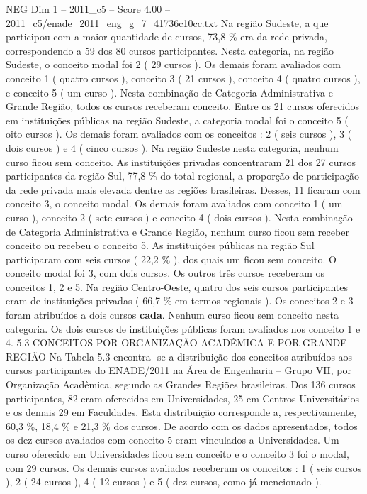 \begin{textsample}{NEG Dim 1 – 2011\_c5 – Score 4.00 – 2011\_c5/enade\_2011\_eng\_g\_7\_41736c10cc.txt}
Na região Sudeste, a que participou com a maior quantidade de cursos, 73,8 \% era da rede privada, correspondendo a 59 dos 80 cursos participantes.
Nesta categoria, na região Sudeste, o conceito modal foi 2 ( 29 cursos ).
Os demais foram avaliados com conceito 1 ( quatro cursos ), conceito 3 ( 21 cursos ), conceito 4 ( quatro cursos ), e conceito 5 ( um curso ).
Nesta combinação de Categoria Administrativa e Grande Região, todos os cursos receberam conceito.
Entre os 21 cursos oferecidos em instituições públicas na região Sudeste, a categoria modal foi o conceito 5 ( oito cursos ).
Os demais foram avaliados com os conceitos : 2 ( seis cursos ), 3 ( dois cursos ) e 4 ( cinco cursos ).
Na região Sudeste nesta categoria, nenhum curso ficou sem conceito.
As instituições privadas concentraram 21 dos 27 cursos participantes da região Sul, 77,8 \% do total regional, a proporção de participação da rede privada mais elevada dentre as regiões brasileiras.
Desses, 11 ficaram com conceito 3, o conceito modal.
Os demais foram avaliados com conceito 1 ( um curso ), conceito 2 ( sete cursos ) e conceito 4 ( dois cursos ).
Nesta combinação de Categoria Administrativa e Grande Região, nenhum curso ficou sem receber conceito ou recebeu o conceito 5.
As instituições públicas na região Sul participaram com seis cursos ( 22,2 \% ), dos quais um ficou sem conceito.
O conceito modal foi 3, com dois cursos.
Os outros três cursos receberam os conceitos 1, 2 e 5.
Na região Centro-Oeste, quatro dos seis cursos participantes eram de instituições privadas ( 66,7 \% em termos regionais ).
Os conceitos 2 e 3 foram atribuídos a dois cursos \textbf{cada}.
Nenhum curso ficou sem conceito nesta categoria.
Os dois cursos de instituições públicas foram avaliados nos conceito 1 e 4. 5.3 CONCEITOS POR ORGANIZAÇÃO ACADÊMICA E POR GRANDE REGIÃO Na Tabela 5.3 encontra -se a distribuição dos conceitos atribuídos aos cursos participantes do ENADE/2011 na Área de Engenharia – Grupo VII, por Organização Acadêmica, segundo as Grandes Regiões brasileiras.
Dos 136 cursos participantes, 82 eram oferecidos em Universidades, 25 em Centros Universitários e os demais 29 em Faculdades.
Esta distribuição corresponde a, respectivamente, 60,3 \%, 18,4 \% e 21,3 \% dos cursos.
De acordo com os dados apresentados, todos os dez cursos avaliados com conceito 5 eram vinculados a Universidades.
Um curso oferecido em Universidades ficou sem conceito e o conceito 3 foi o modal, com 29 cursos.
Os demais cursos avaliados receberam os conceitos : 1 ( seis cursos ), 2 ( 24 cursos ), 4 ( 12 cursos ) e 5 ( dez cursos, como já mencionado ).

\end{textsample}
